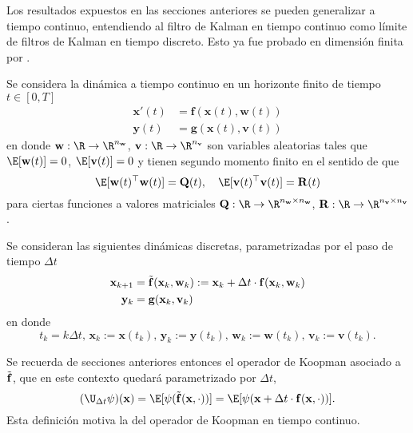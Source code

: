 Los resultados expuestos en las secciones anteriores se pueden generalizar a tiempo continuo, entendiendo al filtro de Kalman en tiempo continuo como límite de filtros de Kalman en tiempo discreto. Esto ya fue probado en dimensión finita por \cite{Shaid1999TheFilter, Kelly2014Well-posednessTime, Lange2022DerivationCoefficients}.

Se considera la dinámica a tiempo continuo en un horizonte finito de tiempo $t \in [0, T]$
\begin{align*}
    \mathbf{x}'(t) & = \mathbf{f}(\mathbf{x}(t), \mathbf{w}(t)) \\
    \mathbf{y}(t) & = \mathbf{g}(\mathbf{x}(t), \mathbf{v}(t))
\end{align*}
en donde $\mathbf{w}: \R \to \R^{n_\mathbf{w}}$, $\mathbf{v}: \R \to \R^{n_\mathbf{v}}$ son variables aleatorias tales que $\E[\mathbf{w}(t)] = 0$, $\E[\mathbf{v}(t)] = 0$ y tienen segundo momento finito en el sentido de que
\begin{equation*}
    \E[ \mathbf{w}(t)^\top \mathbf{w}(t) ] = \mathbf{Q}(t), \quad \E[ \mathbf{v}(t)^\top \mathbf{v}(t) ] = \mathbf{R}(t)
\end{equation*}
para ciertas funciones a valores matriciales $\mathbf{Q}: \R \to \R^{n_\mathbf{w} \times n_\mathbf{w}}$, $\mathbf{R}: \R \to \R^{n_\mathbf{v} \times n_\mathbf{v}}$.

Se consideran las siguientes dinámicas discretas, parametrizadas por el paso de tiempo $\Delta t$
\begin{align*}
    \mathbf{x}_{k+1} & = \Tilde{\mathbf{f}} (\mathbf{x}_k, \mathbf{w}_k) := \mathbf{x}_k + \Delta t \cdot \mathbf{f}(\mathbf{x}_k, \mathbf{w}_k )\\
    \mathbf{y}_k & = \mathbf{g}(\mathbf{x}_k, \mathbf{v}_k)
\end{align*}
en donde 
\begin{equation*}
    t_k = k\Delta t, \,  \mathbf{x}_k := \mathbf{x}(t_k), \,  \mathbf{y}_k := \mathbf{y}(t_k), \, \mathbf{w}_k := \mathbf{w}(t_k), \, \mathbf{v}_k := \mathbf{v}(t_k).
\end{equation*}

Se recuerda de secciones anteriores entonces el operador de Koopman asociado a $\Tilde{\mathbf{f}}$, que en este contexto quedará parametrizado por $\Delta t$,
\[
(\U_{\Delta t} \psi)(\mathbf{x}) = \E [\psi (\Tilde{\mathbf{f}} (\mathbf{x}, \cdot))] = \E [\psi (\mathbf{x} + \Delta t \cdot \mathbf{f} (\mathbf{x}, \cdot))].
\]
Esta definición motiva la del operador de Koopman en tiempo continuo.


